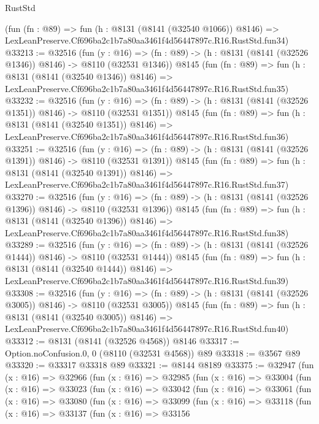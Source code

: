 \begin{lexlean}{RustStd}
\begin{coremodule}
    (fun (fn : @89) =>
    fun (h : @8131 (@8141 (@32540 @1066)) @8146) =>
    LexLeanPreserve.Cf696ba2c1b7a80aa3461f4d56447897c.R16.RustStd.fun34)
@33213 := @32516
    (fun (y : @16) =>
    (fn : @89) -> (h : @8131 (@8141 (@32526 @1346)) @8146) -> @8110 (@32531 @1346))
    @8145
    (fun (fn : @89) =>
    fun (h : @8131 (@8141 (@32540 @1346)) @8146) =>
    LexLeanPreserve.Cf696ba2c1b7a80aa3461f4d56447897c.R16.RustStd.fun35)
@33232 := @32516
    (fun (y : @16) =>
    (fn : @89) -> (h : @8131 (@8141 (@32526 @1351)) @8146) -> @8110 (@32531 @1351))
    @8145
    (fun (fn : @89) =>
    fun (h : @8131 (@8141 (@32540 @1351)) @8146) =>
    LexLeanPreserve.Cf696ba2c1b7a80aa3461f4d56447897c.R16.RustStd.fun36)
@33251 := @32516
    (fun (y : @16) =>
    (fn : @89) -> (h : @8131 (@8141 (@32526 @1391)) @8146) -> @8110 (@32531 @1391))
    @8145
    (fun (fn : @89) =>
    fun (h : @8131 (@8141 (@32540 @1391)) @8146) =>
    LexLeanPreserve.Cf696ba2c1b7a80aa3461f4d56447897c.R16.RustStd.fun37)
@33270 := @32516
    (fun (y : @16) =>
    (fn : @89) -> (h : @8131 (@8141 (@32526 @1396)) @8146) -> @8110 (@32531 @1396))
    @8145
    (fun (fn : @89) =>
    fun (h : @8131 (@8141 (@32540 @1396)) @8146) =>
    LexLeanPreserve.Cf696ba2c1b7a80aa3461f4d56447897c.R16.RustStd.fun38)
@33289 := @32516
    (fun (y : @16) =>
    (fn : @89) -> (h : @8131 (@8141 (@32526 @1444)) @8146) -> @8110 (@32531 @1444))
    @8145
    (fun (fn : @89) =>
    fun (h : @8131 (@8141 (@32540 @1444)) @8146) =>
    LexLeanPreserve.Cf696ba2c1b7a80aa3461f4d56447897c.R16.RustStd.fun39)
@33308 := @32516
    (fun (y : @16) =>
    (fn : @89) -> (h : @8131 (@8141 (@32526 @3005)) @8146) -> @8110 (@32531 @3005))
    @8145
    (fun (fn : @89) =>
    fun (h : @8131 (@8141 (@32540 @3005)) @8146) =>
    LexLeanPreserve.Cf696ba2c1b7a80aa3461f4d56447897c.R16.RustStd.fun40)
@33312 := @8131 (@8141 (@32526 @4568)) @8146
@33317 := Option.noConfusion.{0, 0} (@8110 (@32531 @4568)) @89
@33318 := @3567 @89
@33320 := @33317 @33318 @89
@33321 := @8144 @8189
@33375 := @32947
    (fun (x : @16) =>
    @32966
      (fun (x : @16) =>
      @32985
        (fun (x : @16) =>
        @33004
          (fun (x : @16) =>
          @33023
            (fun (x : @16) =>
            @33042
              (fun (x : @16) =>
              @33061
                (fun (x : @16) =>
                @33080
                  (fun (x : @16) =>
                  @33099
                    (fun (x : @16) =>
                    @33118
                      (fun (x : @16) =>
                      @33137
                        (fun (x : @16) =>
                        @33156

\end{coremodule}
\end{lexlean}
